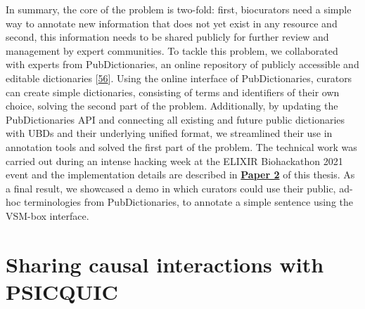 \documentclass[
  12pt,
]{book}
\begin{document}
In summary, the core of the problem is two-fold: first, biocurators need a simple way to annotate new information that does not yet exist in any resource and second, this information needs to be shared publicly for further review and management by expert communities.
To tackle this problem, we collaborated with experts from PubDictionaries, an online repository of publicly accessible and editable dictionaries {[}\protect\hyperlink{ref-Kim2019}{56}{]}.
Using the online interface of PubDictionaries, curators can create simple dictionaries, consisting of terms and identifiers of their own choice, solving the second part of the problem.
Additionally, by updating the PubDictionaries API and connecting all existing and future public dictionaries with UBDs and their underlying unified format, we streamlined their use in annotation tools and solved the first part of the problem.
The technical work was carried out during an intense hacking week at the ELIXIR Biohackathon 2021 event and the implementation details are described in \textbf{\protect\hyperlink{Paper2}{Paper 2}} of this thesis.
As a final result, we showcased a demo in which curators could use their public, ad-hoc terminologies from PubDictionaries, to annotate a simple sentence using the VSM-box interface.

\newpage

\hypertarget{sharing-causal-interactions-with-psicquic}{%
\section*{Sharing causal interactions with PSICQUIC}\label{sharing-causal-interactions-with-psicquic}}

\indent
\end{document}
